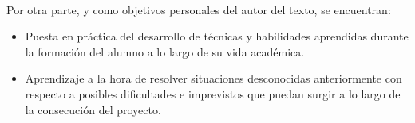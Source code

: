 \paragraph{}Por otra parte, y como objetivos personales del autor del texto, se
encuentran:

\begin{itemize}
   \item Puesta en práctica del desarrollo de técnicas y habilidades aprendidas
   durante la formación del alumno a lo largo de su vida académica.

   \item Aprendizaje a la hora de resolver situaciones desconocidas
   anteriormente con respecto a posibles dificultades e imprevistos que puedan
   surgir a lo largo de la consecución del proyecto.
\end{itemize}
